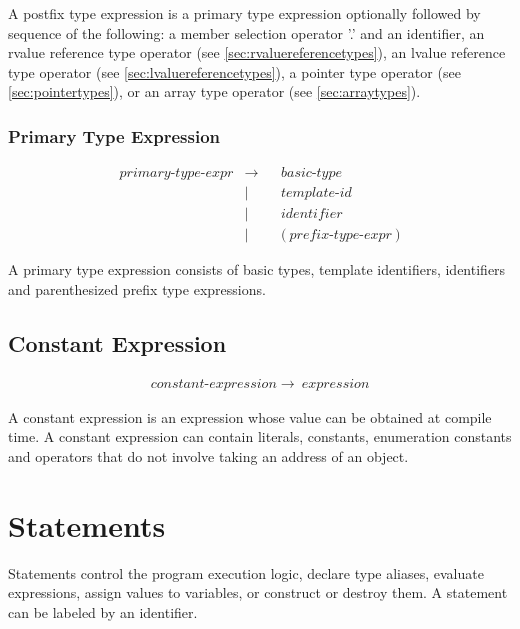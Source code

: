 \documentclass[a4paper,oneside,11pt]{article}
\begin{document}
A postfix type expression is a primary type expression optionally followed by sequence of the
following:
a member selection operator '.' and an identifier, an rvalue reference type operator (see \ref{sec:rvaluereferencetypes}),
an lvalue reference type operator (see \ref{sec:lvaluereferencetypes}), a pointer type operator (see \ref{sec:pointertypes}),
or an array type operator (see \ref{sec:arraytypes}).

\subsubsection{Primary Type Expression}\label{primarytypeexpr}

\begin{align*}
primary\textrm{-}type\textrm{-}expr &\rightarrow & &\hyperref[basictype]{basic\textrm{-}type}\\
&| & &\hyperref[templateid]{template\textrm{-}id}\\
&| & &\hyperref[identifier]{identifier}\\
&| & &\texttt{(} \> \hyperref[prefixtypeexpr]{prefix\textrm{-}type\textrm{-}expr} \> \texttt{)}
\end{align*}

A primary type expression consists of basic types, template identifiers, identifiers and parenthesized
prefix type expressions.

\subsection{Constant Expression}\label{constantexpr}

\begin{align*}
constant\textrm{-}expression \rightarrow \> \hyperref[expression]{expression}
\end{align*}

A constant expression is an expression whose value can be obtained at compile time.
A constant expression can contain literals, constants, enumeration constants and operators that
do not involve taking an address of an object.

\section{Statements}\label{statement}

Statements control the program execution logic, declare type aliases, evaluate expressions,
assign values to variables, or construct or destroy them.
A statement can be labeled by an identifier.
\end{document}
